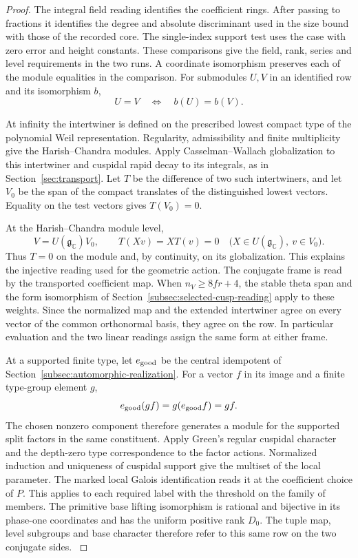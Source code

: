 \begin{proof}
The integral field reading identifies the coefficient rings. After
passing to fractions it identifies the degree and absolute
discriminant used in the size bound with those of the recorded core.
The single-index support test uses the case with zero error and
height constants. These comparisons give the field, rank, series
and level requirements in the two runs. A coordinate isomorphism preserves each of the module equalities in the comparison. For submodules \(U,V\) in an identified row and its isomorphism \(b\),
\[
 U=V\quad\Longleftrightarrow\quad b(U)=b(V).
\]
\label{cor:linked-family-rows-3}

At infinity the intertwiner is defined on the prescribed lowest
compact type of the polynomial Weil representation. Regularity,
admissibility and finite multiplicity give the Harish--Chandra
modules. Apply Casselman--Wallach globalization to this intertwiner
and cuspidal rapid decay to its integrals, as in
Section~\ref{sec:transport}. Let \(T\) be the difference of two such intertwiners,
and let \(V_0\) be the span of the compact translates of the
distinguished lowest vectors. Equality on the test vectors gives
\(T(V_0)=0\).

At the Harish--Chandra module level,
\[
 V=U(\mathfrak g_{\mathbb C})V_0,\qquad
 T(Xv)=X T(v)=0
 \quad\bigl(X\in U(\mathfrak g_{\mathbb C}),\ v\in V_0\bigr).
\]
Thus \(T=0\) on the module and, by continuity, on its globalization. This explains the injective reading used for the geometric
action. The conjugate frame is read by the transported coefficient
map. When \(n_V\ge8fr+4\), the stable theta span and the form
isomorphism of Section~\ref{subsec:selected-cusp-reading}
apply to these weights. Since the normalized map and the extended
intertwiner agree on every vector of the common orthonormal basis,
they agree on the row. In particular evaluation and the two
linear readings assign the same form at either frame.

At a supported finite type, let \(e_{\rm good}\) be the central
idempotent of Section~\ref{subsec:automorphic-realization}. For a
vector \(f\) in its image and a finite type-group element \(g\),
\[
       e_{\rm good}(g f)=g(e_{\rm good}f)=g f .
\]
The chosen nonzero component therefore generates a module for
the supported split factors in the same constituent. Apply
Green's regular cuspidal character and the depth-zero type
correspondence to the factor actions. Normalized induction and
uniqueness of cuspidal support give the multiset of the local
parameter. The marked local Galois identification reads it at
the coefficient choice of \(P\). This applies to each required
label with the threshold on the family of members. The primitive
base lifting isomorphism is rational and bijective in its
phase-one coordinates and has the uniform positive rank \(D_0\).
The tuple map, level subgroups and base character therefore
refer to this same row on the two conjugate sides.
\label{cor:linked-family-rows-4}

\end{proof}

